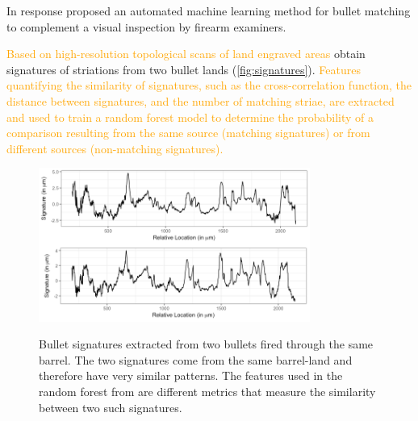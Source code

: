 \documentclass[AMS,STIX2COL]{WileyNJD-v2}\usepackage[]{graphicx}\usepackage[]{color}
\newcommand{\hh}[1]{\textcolor{orange}{#1}}
\begin{document}
{%
In response \citet{hare:2016} proposed an automated machine learning method for bullet matching to complement a visual inspection by  firearm examiners.

\hh{Based on high-resolution topological scans of land engraved areas}
\citet{hare:2016} obtain signatures of  striations from   two bullet lands (\autoref{fig:signatures}). \hh{Features quantifying the similarity of signatures, such as the cross-correlation function, the distance between signatures, and the number of matching striae, are extracted and used to %
train a random forest model to determine the probability of a comparison resulting from the same source (matching signatures) or from different sources (non-matching signatures).}

\begin{figure}[!t]
\centering
\includegraphics[width=3.5in]{./figure-static/signatures.png}
\label{fig:signatures}
\caption{Bullet signatures extracted from two bullets fired through the same barrel. The two signatures come from the same barrel-land and therefore have very similar patterns. The features used in the random forest from \citet{hare:2016} are different metrics that measure the similarity between two such signatures.}
\end{figure}




}
\end{document}
